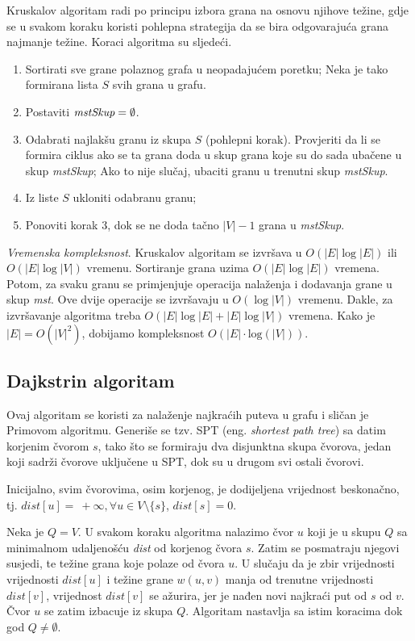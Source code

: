 \documentclass[a4paper, utf8, 11pt, colorlinks]{book}
\theoremstyle{definition}
\begin{document}
Kruskalov algoritam radi po principu izbora grana na osnovu njihove težine, gdje se u svakom koraku koristi pohlepna strategija da se bira odgovarajuća grana najmanje težine.
Koraci algoritma su sljedeći.
 

\begin{enumerate}
	
	\item Sortirati sve grane polaznog grafa u neopadajućem poretku; Neka je tako formirana lista $S$ svih grana u grafu.
	\item Postaviti $\emph{mstSkup} = \emptyset$. 
	\item Odabrati najlakšu granu iz skupa $S$ (pohlepni korak). Provjeriti da li se formira ciklus ako se ta 
	grana doda u skup grana koje su do sada ubačene u skup \emph{mstSkup}; Ako to nije slučaj, ubaciti granu u trenutni skup \emph{mstSkup}. 
	\item Iz liste $S$ ukloniti odabranu granu;
	\item Ponoviti korak 3, dok se ne doda tačno $|V|-1$ grana u \emph{mstSkup}.
\end{enumerate} 

 \emph{Vremenska kompleksnost}. Kruskalov algoritam se izvršava u $O(|E|\log |E|)$ ili $O(|E|\log |V|)$ vremenu. Sortiranje grana uzima $O(|E| \log|E|)$ vremena. Potom, za svaku granu 
se primjenjuje operacija nalaženja i dodavanja grane u skup \emph{mst}. Ove dvije operacije se izvršavaju u $O(\log |V|)$ vremenu. Dakle, za izvršavanje algoritma treba $O(|E|\log |E| + |E|\log |V|)$ vremena. Kako je $|E|=O(|V|^2)$, dobijamo kompleksnost $O(|E| \cdot \mathrm{log}(|V|))$. 

\subsection{Dajkstrin algoritam}

Ovaj algoritam se koristi za nalaženje najkraćih puteva u grafu i sličan je Primovom algoritmu. Generiše se tzv. SPT (eng. \emph{shortest path tree}) sa datim korjenim čvorom $s$, tako  što se formiraju dva disjunktna skupa čvorova, jedan koji sadrži čvorove uključene u SPT, dok su u drugom svi ostali čvorovi. 


Inicijalno, svim čvorovima, osim korjenog, je dodijeljena vrijednost beskonačno, tj. $dist[u]=\ +\infty, \forall u \in V\setminus \{s\}$, $dist[s]=0$. 

Neka je $Q = V$.  
U svakom koraku algoritma nalazimo čvor $u$ koji je u skupu $Q$ sa minimalnom udaljenošću \emph{dist} od korjenog čvora $s$. Zatim se posmatraju njegovi susjedi, te težine grana koje polaze od čvora $u$. U slučaju da je zbir vrijednosti vrijednosti $dist[u]$  i težine grane $w(u,v)$ manja od trenutne vrijednosti $dist[v]$, vrijednost $dist[v]$ se ažurira, jer je nađen novi najkraći put od $s$ od $v$.  Čvor $u$ se zatim izbacuje iz skupa $Q$. Algoritam nastavlja sa istim koracima dok god $Q \neq \emptyset$. 
\end{document}
